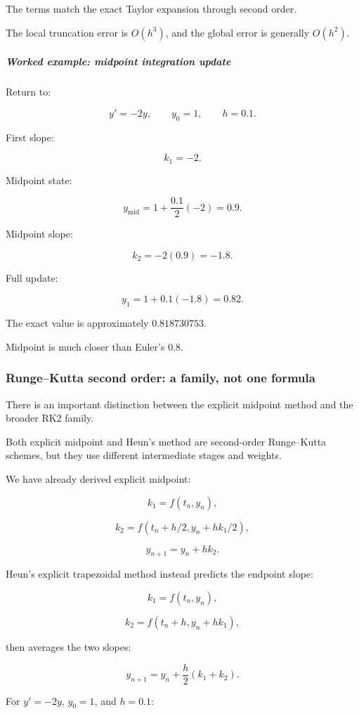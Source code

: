 The terms match the exact Taylor expansion through second order.

The local truncation error is \(O(h^3)\), and the global error is generally \(O(h^2)\).

\subparagraph{Worked example: midpoint integration update}\label{02-foundations-ii-ch025-worked-example-midpoint-integration-update}

Return to:

\[
y'=-2y,\qquad y_0=1,\qquad h=0.1.
\]

First slope:

\[
k_1=-2.
\]

Midpoint state:

\[
y_{\mathrm{mid}} = 1+\frac{0.1}{2}(-2) =0.9.
\]

Midpoint slope:

\[
k_2=-2(0.9)=-1.8.
\]

Full update:

\[
y_1=1+0.1(-1.8)=\boxed{0.82}.
\]

The exact value is approximately \(0.818730753\).

Midpoint is much closer than Euler's \(0.8\).

\subsubsection{Runge--Kutta second order: a family, not one formula}\label{02-foundations-ii-ch025-rungekutta-second-order-a-family-not-one-formula}

There is an important distinction between the explicit midpoint method and the broader RK2 family.

Both explicit midpoint and Heun's method are second-order Runge--Kutta schemes, but they use different intermediate stages and weights.

We have already derived explicit midpoint:

\[
k_1=f(t_n,y_n),
\]

\[
k_2=f(t_n+h/2,y_n+hk_1/2),
\]

\[
y_{n+1}=y_n+hk_2.
\]

Heun's explicit trapezoidal method instead predicts the endpoint slope:

\[
k_1=f(t_n,y_n),
\]

\[
k_2=f(t_n+h,y_n+hk_1),
\]

then averages the two slopes:

\[
\boxed{ y_{n+1} = y_n+\frac h2(k_1+k_2) }.
\]

For \(y'=-2y\), \(y_0=1\), and \(h=0.1\):

